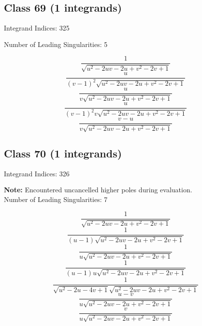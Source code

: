 \documentclass[11pt,a4paper]{article}
\begin{document}
\subsection*{Class 69 (1 integrands)}
Integrand Indices: 325

Number of Leading Singularities: 5

\begin{equation}
\frac{1}{\sqrt{u^2-2 u v-2 u+v^2-2 v+1}}
\end{equation}
\begin{equation}
\frac{u}{(v-1)^2 \sqrt{u^2-2 u v-2 u+v^2-2 v+1}}
\end{equation}
\begin{equation}
\frac{u}{v \sqrt{u^2-2 u v-2 u+v^2-2 v+1}}
\end{equation}
\begin{equation}
\frac{u}{(v-1)^2 v \sqrt{u^2-2 u v-2 u+v^2-2 v+1}}
\end{equation}
\begin{equation}
\frac{v-u}{v \sqrt{u^2-2 u v-2 u+v^2-2 v+1}}
\end{equation}


\subsection*{Class 70 (1 integrands)}
Integrand Indices: 326

\textbf{Note:} Encountered uncancelled higher poles during evaluation.\\[1em]

Number of Leading Singularities: 7

\begin{equation}
\frac{1}{\sqrt{u^2-2 u v-2 u+v^2-2 v+1}}
\end{equation}
\begin{equation}
\frac{1}{(u-1) \sqrt{u^2-2 u v-2 u+v^2-2 v+1}}
\end{equation}
\begin{equation}
\frac{1}{u \sqrt{u^2-2 u v-2 u+v^2-2 v+1}}
\end{equation}
\begin{equation}
\frac{1}{(u-1) u \sqrt{u^2-2 u v-2 u+v^2-2 v+1}}
\end{equation}
\begin{equation}
\frac{1}{\sqrt{u^2-2 u-4 v+1} \sqrt{u^2-2 u v-2 u+v^2-2 v+1}}
\end{equation}
\begin{equation}
\frac{u-v}{u \sqrt{u^2-2 u v-2 u+v^2-2 v+1}}
\end{equation}
\begin{equation}
\frac{v}{u \sqrt{u^2-2 u v-2 u+v^2-2 v+1}}
\end{equation}
\end{document}
